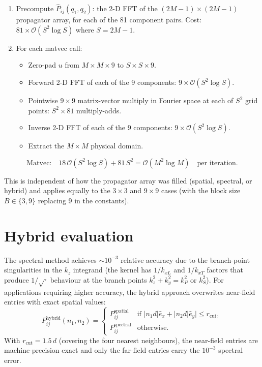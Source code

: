\documentclass[11pt,a4paper]{article}
\newcommand{\order}[1]{\mathcal{O}\!\left(#1\right)}
\begin{document}
\begin{enumerate}
\item Precompute $\hat{P}_{ij}(q_1, q_2)$: the 2-D FFT of the
  $(2M{-}1)\times(2M{-}1)$ propagator array, for each of the
  81 component pairs.
  Cost: $81 \times \order{S^2 \log S}$ where $S = 2M{-}1$.

\item For each matvec call:
  \begin{itemize}
    \item Zero-pad $u$ from $M\times M\times 9$ to
      $S\times S\times 9$.
    \item Forward 2-D FFT of each of the 9 components:
      $9\times\order{S^2\log S}$.
    \item Pointwise $9\times 9$ matrix-vector multiply in
      Fourier space at each of $S^2$ grid points:
      $S^2 \times 81$ multiply-adds.
    \item Inverse 2-D FFT of each of the 9 components:
      $9\times\order{S^2\log S}$.
    \item Extract the $M\times M$ physical domain.
  \end{itemize}
\end{enumerate}

\begin{equation}\label{eq:matvec_cost}
\boxed{
  \text{Matvec:}\quad
  18\,\order{S^2\log S} + 81\,S^2
  = \order{M^2\log M}
  \quad\text{per iteration}.
}
\end{equation}

This is independent of how the propagator array was filled
(spatial, spectral, or hybrid) and applies equally to the
$3\times 3$ and $9\times 9$ cases (with the block size
$B \in \{3, 9\}$ replacing 9 in the constants).


\section{Hybrid evaluation}\label{sec:hybrid}

The spectral method achieves $\sim 10^{-3}$ relative accuracy
due to the branch-point singularities in the $k_z$ integrand
(the kernel has $1/k_{xL}$ and $1/k_{xT}$ factors that
produce $1/\sqrt{\cdot}$ behaviour at the branch points
$k_z^2 + k_y^2 = k_P^2$ or $k_S^2$).
For applications requiring higher accuracy, the hybrid
approach overwrites near-field entries with exact spatial
values:
\begin{equation}\label{eq:hybrid}
  P_{ij}^{\text{hybrid}}(n_1, n_2) =
  \begin{cases}
    P_{ij}^{\text{spatial}} & \text{if } |n_1 d|\hat{e}_x + |n_2 d|\hat{e}_y| \le r_{\text{cut}},\\
    P_{ij}^{\text{spectral}} & \text{otherwise}.
  \end{cases}
\end{equation}
With $r_{\text{cut}} = 1.5\,d$ (covering the four nearest
neighbours), the near-field entries are machine-precision
exact and only the far-field entries carry the $10^{-3}$
spectral error.
\end{document}
